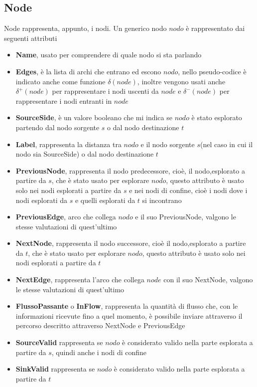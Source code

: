 \documentclass{article}
\begin{document}
\subsection{Node}
Node rappresenta, appunto, i nodi.
Un generico nodo $nodo$ è rappresentato dai seguenti attributi
\begin{itemize}
    \item \textbf{Name}, usato per comprendere di quale nodo si sta parlando %
    \item \textbf{Edges}, è la lista di archi che entrano ed escono $nodo$, nello pseudo-codice è indicato anche come funzione $\delta(node)$, inoltre vengono usati anche $\delta^+(node)$ per rappresentare i nodi uscenti da $node$ e $\delta^-(node)$ per rappresentare i nodi entranti in $node$
    \item \textbf{SourceSide}, è un valore booleano che mi indica se $nodo$ è stato esplorato partendo dal nodo sorgente $s$ o dal nodo destinazione $t$
    \item \textbf{Label}, rappresenta la distanza tra $nodo$ e il nodo sorgente $s$(nel caso in cui il nodo sia SourceSide) o dal nodo destinazione $t$
    \item \textbf{PreviousNode}, rappresenta il nodo predecessore, cioè, il nodo,esplorato a partire da $s$, che è stato usato per esplorare $nodo$, questo attributo è usato solo nei nodi esplorati a partire da $s$ e nei nodi di confine, cioè i nodi dove i nodi esplorati da $s$ e quelli esplorati da $t$ si incontrano
    \item \textbf{PreviousEdge}, arco che collega $nodo$ e il suo PreviousNode, valgono le stesse valutazioni di quest'ultimo
    \item \textbf{NextNode}, rappresenta il nodo successore, cioè il nodo,esplorato a partire da $t$, che è stato usato per esplorare $nodo$, questo attributo è usato solo nei nodi esplorati a partire da $t$
    \item \textbf{NextEdge}, rappresenta l'arco che collega $node$ con il suo NextNode, valgono le stesse valutazioni di quest'ultimo
    \item \textbf{FlussoPassante} o \textbf{InFlow}, rappresenta la quantità di flusso che, con le informazioni ricevute fino a quel momento, è possibile inviare  attraverso il percorso descritto attraverso NextNode e PreviousEdge
    \item \textbf{SourceValid} rappresenta se $nodo$ è considerato valido nella parte esplorata a partire da $s$, quindi anche i nodi di confine
    \item \textbf{SinkValid} rappresenta se $nodo$ è considerato valido nella parte esplorata a partire da $t$
\end{itemize}
\end{document}
